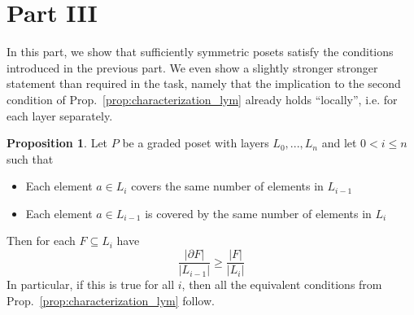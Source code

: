 \documentclass{scrartcl}
\theoremstyle{definition}
\newtheorem{proposition}[definition]{Proposition}
\begin{document}
\section{Part III}
In this part, we show that sufficiently symmetric posets satisfy the conditions introduced in the previous part.
We even show a slightly stronger stronger statement than required in the task, namely that the implication to the second condition of Prop.~\ref{prop:characterization_lym} already holds ``locally'', i.e. for each layer separately.
\begin{proposition}
    \label{prop:biregular_implies_lym}
    Let $P$ be a graded poset with layers $L_0, ..., L_n$ and let $0 < i \leq n$ such that
    \begin{itemize}
        \item Each element $a \in L_i$ covers the same number of elements in $L_{i - 1}$
        \item Each element $a \in L_{i - 1}$ is covered by the same number of elements in $L_i$
    \end{itemize}
    Then for each $F \subseteq L_i$ have
    \begin{equation*}
        \frac {|\partial F|} {|L_{i - 1}|} \geq \frac {|F|} {|L_i|}
    \end{equation*}
    In particular, if this is true for all $i$, then all the equivalent conditions from Prop.~\ref{prop:characterization_lym} follow.
\end{proposition}
\end{document}
